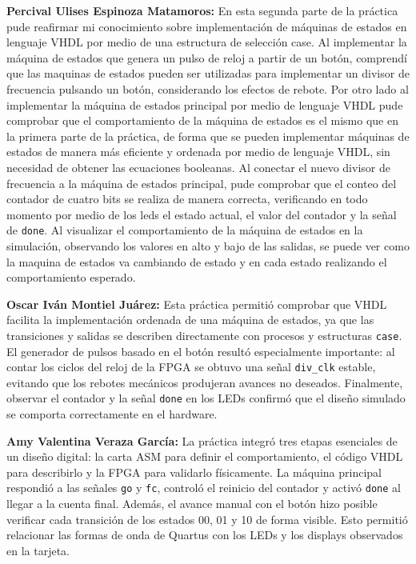 \documentclass[letterpaper,12pt]{article}
\begin{document}
\textbf{Percival Ulises Espinoza Matamoros:} En esta segunda parte de la práctica pude reafirmar mi conocimiento sobre implementación de máquinas de estados en lenguaje VHDL por medio de una estructura de selección case. Al implementar la máquina de estados que genera un pulso de reloj a partir de un botón, comprendí que las maquinas de estados pueden ser utilizadas para implementar un divisor de frecuencia pulsando un botón, considerando los efectos de rebote. Por otro lado al implementar la máquina de estados principal por medio de lenguaje VHDL pude comprobar que el comportamiento de la máquina de estados es el mismo que en la primera parte de la práctica, de forma que se pueden implementar máquinas de estados de manera más eficiente y ordenada por medio de lenguaje VHDL, sin necesidad de obtener las ecuaciones booleanas. Al conectar el nuevo divisor de frecuencia a la máquina de estados principal, pude comprobar que el conteo del contador de cuatro bits se realiza de manera correcta, verificando en todo momento por medio de los leds el estado actual, el valor del contador y la señal de \texttt{done}. Al visualizar el comportamiento de la máquina de estados en la simulación, observando los valores en alto y bajo de las salidas, se puede ver como la maquina de estados va cambiando de estado y en cada estado realizando el comportamiento esperado.

\textbf{Oscar Iván Montiel Juárez:} Esta práctica permitió comprobar que VHDL facilita la implementación ordenada de una máquina de estados, ya que las transiciones y salidas se describen directamente con procesos y estructuras \texttt{case}. El generador de pulsos basado en el botón resultó especialmente importante: al contar los ciclos del reloj de la FPGA se obtuvo una señal \texttt{div\_clk} estable, evitando que los rebotes mecánicos produjeran avances no deseados. Finalmente, observar el contador y la señal \texttt{done} en los LEDs confirmó que el diseño simulado se comporta correctamente en el hardware.

\textbf{Amy Valentina Veraza García:} La práctica integró tres etapas esenciales de un diseño digital: la carta ASM para definir el comportamiento, el código VHDL para describirlo y la FPGA para validarlo físicamente. La máquina principal respondió a las señales \texttt{go} y \texttt{fc}, controló el reinicio del contador y activó \texttt{done} al llegar a la cuenta final. Además, el avance manual con el botón hizo posible verificar cada transición de los estados 00, 01 y 10 de forma visible. Esto permitió relacionar las formas de onda de Quartus con los LEDs y los displays observados en la tarjeta.
\nocite{*}
\end{document}
